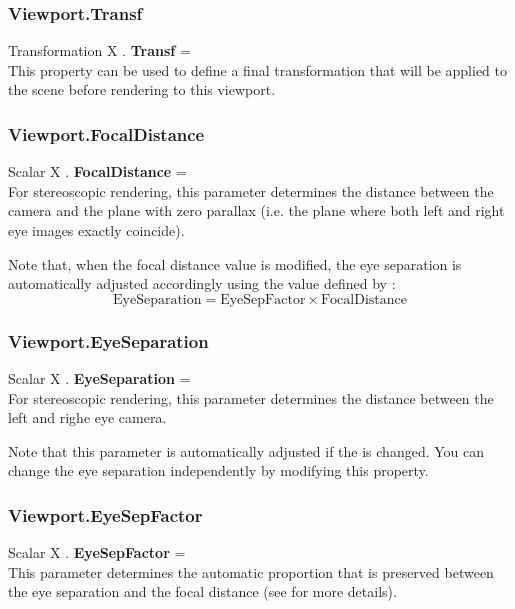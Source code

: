 \subsubsection{Viewport.Transf \label{F:Viewport:Transf}}
Transformation X . \textbf{Transf} = \\
This property can be used to define a final transformation that will be applied to the scene before rendering to this viewport.

\subsubsection{Viewport.FocalDistance \label{F:Viewport:FocalDistance}}
Scalar X . \textbf{FocalDistance} = \\
For stereoscopic rendering, this parameter determines the distance between the camera and the plane with zero parallax (i.e. the plane where both left and right eye images exactly coincide).

Note that, when the focal distance value is modified, the eye separation is automatically adjusted accordingly using the value defined by :
\begin{equation}
\mbox{EyeSeparation} = \mbox{EyeSepFactor} \times \mbox{FocalDistance}
\end{equation}

\subsubsection{Viewport.EyeSeparation \label{F:Viewport:EyeSeparation}}
Scalar X . \textbf{EyeSeparation} = \\
For stereoscopic rendering, this parameter determines the distance between the left and righe eye camera.

Note that this parameter is automatically adjusted if the  is changed. You can change the eye separation independently by modifying this property.

\subsubsection{Viewport.EyeSepFactor \label{F:Viewport:EyeSepFactor}}
Scalar X . \textbf{EyeSepFactor} = \\
This parameter determines the automatic proportion that is preserved between the eye separation and the focal distance (see  for more details).

